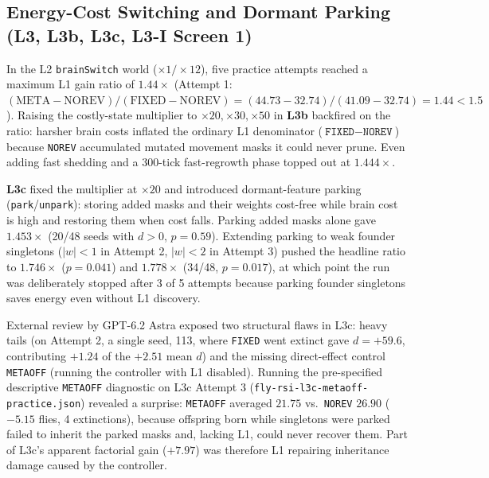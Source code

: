\subsection{Energy-Cost Switching and Dormant Parking (L3, L3b, L3c, L3-I Screen 1)}

In the L2 \texttt{brainSwitch} world ($\times 1/\times 12$), five practice attempts reached a maximum L1 gain ratio of $1.44\times$ (Attempt 1: $(\text{META}-\text{NOREV})/(\text{FIXED}-\text{NOREV}) = (44.73-32.74)/(41.09-32.74) = 1.44 < 1.5$). Raising the costly-state multiplier to $\times 20, \times 30, \times 50$ in \textbf{L3b} backfired on the ratio: harsher brain costs inflated the ordinary L1 denominator ($\texttt{FIXED}-\texttt{NOREV}$) because \texttt{NOREV} accumulated mutated movement masks it could never prune. Even adding fast shedding and a 300-tick fast-regrowth phase topped out at $1.444\times$.

\textbf{L3c} fixed the multiplier at $\times 20$ and introduced dormant-feature parking (\texttt{park}/\texttt{unpark}): storing added masks and their weights cost-free while brain cost is high and restoring them when cost falls. Parking added masks alone gave $1.453\times$ (20/48 seeds with $d>0$, $p=0.59$). Extending parking to weak founder singletons ($|w|<1$ in Attempt 2, $|w|<2$ in Attempt 3) pushed the headline ratio to $1.746\times$ ($p=0.041$) and $1.778\times$ (34/48, $p=0.017$), at which point the run was deliberately stopped after 3 of 5 attempts because parking founder singletons saves energy even without L1 discovery.

External review by GPT-6.2 Astra exposed two structural flaws in L3c: heavy tails (on Attempt 2, a single seed, 113, where \texttt{FIXED} went extinct gave $d=+59.6$, contributing $+1.24$ of the $+2.51$ mean $d$) and the missing direct-effect control \texttt{METAOFF} (running the controller with L1 disabled). Running the pre-specified descriptive \texttt{METAOFF} diagnostic on L3c Attempt 3 (\texttt{fly-rsi-l3c-metaoff-practice.json}) revealed a surprise: \texttt{METAOFF} averaged $21.75$ vs.\ \texttt{NOREV} $26.90$ ($-5.15$ flies, 4 extinctions), because offspring born while singletons were parked failed to inherit the parked masks and, lacking L1, could never recover them. Part of L3c's apparent factorial gain ($+7.97$) was therefore L1 repairing inheritance damage caused by the controller.


